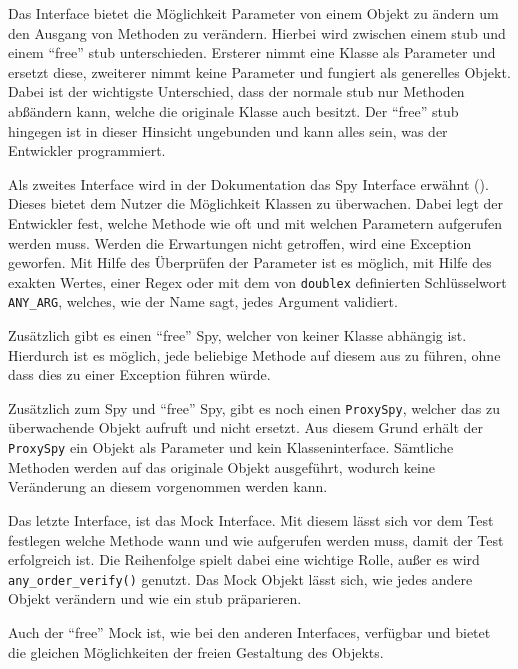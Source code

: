 Das Interface bietet die Möglichkeit Parameter von einem Objekt zu ändern
um den Ausgang von Methoden zu verändern. Hierbei wird zwischen einem \Gls{stub}
und einem "`free"' \Gls{stub} unterschieden. Ersterer nimmt eine Klasse als
Parameter und ersetzt diese, zweiterer nimmt keine Parameter und fungiert als
generelles Objekt. Dabei ist der wichtigste Unterschied, dass der normale
\Gls{stub} nur Methoden abßändern kann, welche die originale Klasse auch 
besitzt. Der "`free"' \Gls{stub} hingegen ist in dieser Hinsicht ungebunden und 
kann alles sein, was der Entwickler programmiert.
\newline

Als zweites Interface wird in der Dokumentation das Spy Interface erwähnt
(\cite{doublex:docs:1.8.1}). Dieses bietet dem Nutzer die Möglichkeit Klassen zu
überwachen. Dabei legt der Entwickler fest, welche Methode wie oft und mit
welchen Parametern aufgerufen werden muss. Werden die Erwartungen nicht
getroffen, wird eine Exception geworfen. Mit Hilfe des Überprüfen der Parameter 
ist es
möglich, mit Hilfe des exakten Wertes, einer Regex oder mit dem von
\lstinline{doublex} definierten Schlüsselwort \lstinline{ANY_ARG}, welches, wie
der Name sagt, jedes Argument validiert.

Zusätzlich gibt es einen "`free"' Spy, welcher von keiner
Klasse abhängig ist. Hierdurch ist es möglich, jede beliebige Methode auf
diesem aus zu führen, ohne dass dies zu einer Exception führen würde.
\newline

Zusätzlich zum Spy und "`free"' Spy, gibt es noch einen \lstinline{ProxySpy},
welcher das zu überwachende Objekt aufruft und nicht ersetzt. Aus diesem Grund
erhält der \lstinline{ProxySpy} ein Objekt als Parameter und kein
Klasseninterface. Sämtliche Methoden werden auf das originale Objekt ausgeführt,
wodurch keine Veränderung an diesem vorgenommen werden kann.
\newline

Das letzte Interface, ist das Mock Interface. Mit diesem lässt sich vor dem Test
festlegen welche Methode wann und wie aufgerufen werden muss, damit der Test
erfolgreich ist. Die Reihenfolge spielt dabei eine wichtige Rolle, außer es wird
\lstinline{any_order_verify()} genutzt. Das Mock Objekt lässt sich, wie
jedes andere Objekt verändern und wie ein \Gls{stub} präparieren.

Auch der "`free"' Mock ist, wie bei den anderen Interfaces, verfügbar und bietet
die gleichen Möglichkeiten der freien Gestaltung des Objekts.
\newline

